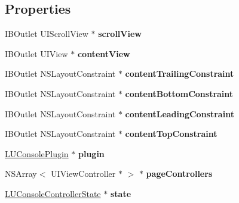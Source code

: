 \subsection*{Properties}
\begin{DoxyCompactItemize}
\item 
\mbox{\label{category_l_u_console_controller_07_08_a8aa3892c998cc31d2fc24141cde75012}} 
I\+B\+Outlet U\+I\+Scroll\+View $\ast$ {\bfseries scroll\+View}
\item 
\mbox{\label{category_l_u_console_controller_07_08_aa53bb79696ec1cd4122016beffc681b2}} 
I\+B\+Outlet U\+I\+View $\ast$ {\bfseries content\+View}
\item 
\mbox{\label{category_l_u_console_controller_07_08_aac56dafb6cecf21044e5968963cd2dcc}} 
I\+B\+Outlet N\+S\+Layout\+Constraint $\ast$ {\bfseries content\+Trailing\+Constraint}
\item 
\mbox{\label{category_l_u_console_controller_07_08_a57f41073fbc453eb68c027df93c869d9}} 
I\+B\+Outlet N\+S\+Layout\+Constraint $\ast$ {\bfseries content\+Bottom\+Constraint}
\item 
\mbox{\label{category_l_u_console_controller_07_08_ab577de0819929d3c091b997cf107e6d9}} 
I\+B\+Outlet N\+S\+Layout\+Constraint $\ast$ {\bfseries content\+Leading\+Constraint}
\item 
\mbox{\label{category_l_u_console_controller_07_08_ac64d1a001fe0a4361841493b969c6a6b}} 
I\+B\+Outlet N\+S\+Layout\+Constraint $\ast$ {\bfseries content\+Top\+Constraint}
\item 
\mbox{\label{category_l_u_console_controller_07_08_a2703d0e65cb4944cf45653954872747c}} 
\mbox{\hyperlink{interface_l_u_console_plugin}{L\+U\+Console\+Plugin}} $\ast$ {\bfseries plugin}
\item 
\mbox{\label{category_l_u_console_controller_07_08_a9aa2e6ac39a078fb988327c65c398d05}} 
N\+S\+Array$<$ U\+I\+View\+Controller $\ast$ $>$ $\ast$ {\bfseries page\+Controllers}
\item 
\mbox{\label{category_l_u_console_controller_07_08_af48c674fd6706cdc9c38999b5a43557e}} 
\mbox{\hyperlink{interface_l_u_console_controller_state}{L\+U\+Console\+Controller\+State}} $\ast$ {\bfseries state}
\end{DoxyCompactItemize}



